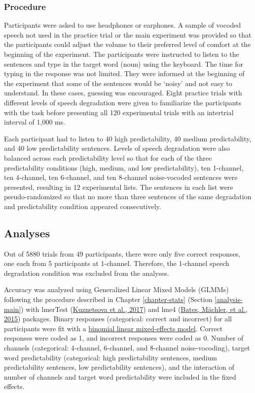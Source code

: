 \documentclass[a4paper, nobind]{templates/ociamthesis}
\begin{document}
\hypertarget{procedure}{%
\subsubsection{Procedure}\label{procedure}}

Participants were asked to use headphones or earphones.
A sample of vocoded speech not used in the practice trial or the main experiment was provided so that the participants could adjust the volume to their preferred level of comfort at the beginning of the experiment.
The participants were instructed to listen to the sentences and type in the target word (noun) using the keyboard.
The time for typing in the response was not limited.
They were informed at the beginning of the experiment that some of the sentences would be `noisy' and not easy to understand.
In these cases, guessing was encouraged.
Eight practice trials with different levels of speech degradation were given to familiarize the participants with the task before presenting all 120 experimental trials with an intertrial interval of 1,000 ms.

Each participant had to listen to 40 high predictability, 40 medium predictability, and 40 low predictability sentences.
Levels of speech degradation were also balanced across each predictability level so that for each of the three predictability conditions (high, medium, and low predictability), ten 1-channel, ten 4-channel, ten 6-channel, and ten 8-channel noise-vocoded sentences were presented, resulting in 12 experimental lists.
The sentences in each list were pseudo-randomized so that no more than three sentences of the same degradation and predictability condition appeared consecutively.

\hypertarget{analyses}{%
\subsection{Analyses}\label{analyses}}

Out of 5880 trials from 49 participants, there were only five correct responses, one each from 5 participants at 1-channel.
Therefore, the 1-channel speech degradation condition was excluded from the analyses.

Accuracy was analyzed using Generalized Linear Mixed Models (GLMMs) following the procedure described in Chapter \ref{chapter-stats} (Section \ref{analysis-main}) with lmerTest (\protect\hyperlink{ref-Kuznetsova2017}{Kuznetsova et al., 2017}) and lme4 (\protect\hyperlink{ref-Bates2015}{Bates, Mächler, et al., 2015}) packages.
Binary responses (categorical: correct and incorrect) for all participants were fit with a \protect\hyperlink{binomial-logistic-mixed-effects-model}{binomial linear mixed-effects model}.
Correct responses were coded as 1, and incorrect responses were coded as 0.
Number of channels (categorical: 4-channel, 6-channel, and 8-channel noise-vocoding), target word predictability (categorical: high predictability sentences, medium predictability sentences, low predictability sentences), and the interaction of number of channels and target word predictability were included in the fixed effects.
\end{document}
